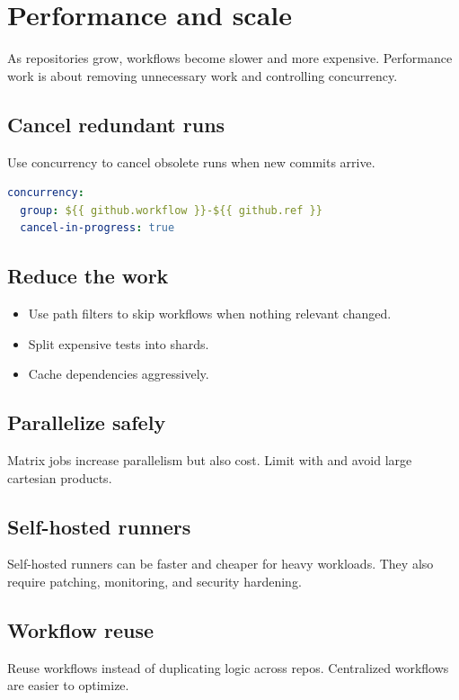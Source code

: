 \chapter{Performance and scale}

As repositories grow, workflows become slower and more expensive.
Performance work is about removing unnecessary work and controlling concurrency.

\section{Cancel redundant runs}
Use concurrency to cancel obsolete runs when new commits arrive.

\begin{lstlisting}[language=YAML]
concurrency:
  group: ${{ github.workflow }}-${{ github.ref }}
  cancel-in-progress: true
\end{lstlisting}

\section{Reduce the work}
\begin{itemize}[nosep]
  \item Use path filters to skip workflows when nothing relevant changed.
  \item Split expensive tests into shards.
  \item Cache dependencies aggressively.
\end{itemize}

\section{Parallelize safely}
Matrix jobs increase parallelism but also cost.
Limit with  and avoid large cartesian products.

\section{Self-hosted runners}
Self-hosted runners can be faster and cheaper for heavy workloads.
They also require patching, monitoring, and security hardening.

\section{Workflow reuse}
Reuse workflows instead of duplicating logic across repos.
Centralized workflows are easier to optimize.

